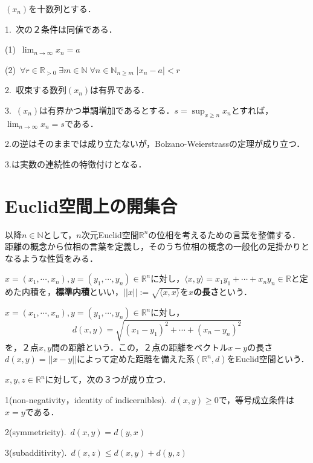 \documentclass[uplatex, 12pt, dvipdfmx]{jsreport}
\begin{document}
\begin{proposition}$(x_n)$を十数列とする．
    
    1.\, 次の２条件は同値である．

    (1)\, $\lim_{n\to\infty}x_n=a$

    (2)\, $\forall r\in\mathbb{R}_{>0}\; \exists m\in\mathbb{N} \; \forall n\in\mathbb{N}_{n\ge m} \; |x_n-a|<r$

    2.\, 収束する数列$(x_n)$は有界である．

    3.\, $(x_n)$は有界かつ単調増加であるとする．$s=\sup_{x\ge n}x_n$とすれば，$\lim_{n\to\infty}x_n=s$である．
\end{proposition}
\begin{remark}
    2.の逆はそのままでは成り立たないが，Bolzano-Weierstrassの定理が成り立つ．

    3.は実数の連続性の特徴付けとなる．
\end{remark}

\section{Euclid空間上の開集合}
以降$n\in\mathbb{N}$として，$n$次元Euclid空間$\mathbb{R}^n$の位相を考えるための言葉を整備する．
距離の概念から位相の言葉を定義し，そのうち位相の概念の一般化の足掛かりとなるような性質をみる．

\begin{definition}[内積と長さ]
    $x=(x_1,\cdots,x_n),y=(y_1,\cdots,y_n)\in\mathbb{R}^n$に対し，$\langle x,y\rangle =x_1y_1+\cdots +x_ny_n\in\mathbb{R}$と定めた内積を，\textbf{標準内積}といい，$||x||:=\sqrt{\langle x,x\rangle}$を\textbf{$x$の長さ}という．
\end{definition}
\begin{definition}[距離]\rm{}
    $x=(x_1,\cdots,x_n),y=(y_1,\cdots,y_n)\in\mathbb{R}^n$に対し，
    \[ d(x,y)=\sqrt{(x_1-y_1)^2+\cdots +(x_n-y_n)^2} \]
    を，２点$x,y$間の距離という．この，２点の距離をベクトル$x-y$の長さ$d(x,y)=||x-y||$によって定めた距離を備えた系$(\mathbb{R}^n,d)$をEuclid空間という．
\end{definition}

\begin{proposition}[距離の性質]\rm{}$x,y,z\in\mathbb{R}^n$に対して，次の３つが成り立つ．

    1(non-negativity，identity of indicernibles).\, $d(x,y)\ge 0$で，等号成立条件は$x=y$である．

    2(symmetricity).\, $d(x,y)=d(y,x)$

    3(subadditivity).\, $d(x,z)\le d(x,y)+d(y,z)$
\end{proposition}
\end{document}

